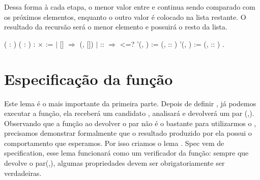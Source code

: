    Dessa forma à cada etapa, o menor valor entre  e  continua sendo comparado com os próximos elementos, enquanto o outro valor é colocado na lista restante. O resultado da recursão  será o menor elemento e  possuirá o resto da lista.


    
\begin{coqdoccode}
\coqdocemptyline
\coqdocnoindent
{}  ( : ) ( :  ) :  \ensuremath{\times}   :=\coqdoceol
\coqdocindent{1.00em}
  \coqdoceol
\coqdocindent{1.00em}
\ensuremath{|} [] \ensuremath{\Rightarrow} (, [])\coqdoceol
\coqdocindent{1.00em}
\ensuremath{|}  ::  \ensuremath{\Rightarrow}\coqdoceol
\coqdocindent{3.00em}
  <=?  \coqdoceol
\coqdocindent{4.00em}
 '(, ) :=    \coqdoceol
\coqdocindent{4.00em}
(,  :: )\coqdoceol
\coqdocindent{3.00em}
\coqdoceol
\coqdocindent{4.00em}
 '(, ) :=    \coqdoceol
\coqdocindent{4.00em}
(,  :: )\coqdoceol
\coqdocindent{1.00em}
.\coqdoceol
\coqdocemptyline
\end{coqdoccode}
\section{Especificação da função \texorpdfstring{\protect{}}{select}}




    Este lema é o mais importante da primeira parte. Depois de definir , já podemos 
    executar a função, ela receberá um candidato , analisará  e devolverá um par (,).
    Observando que a função ao devolver o par não é o bastante para utilizarmos o , precisamos demonstrar
    formalmente que o resultado produzido por ela possui o comportamento que esperamos. Por isso criamos o lema .
    Spec vem de specification, esse lema funcionará como um verificador da função: sempre que   
    devolve o par(,), algumas propriedades devem ser obrigatoriamente ser verdadeiras.


